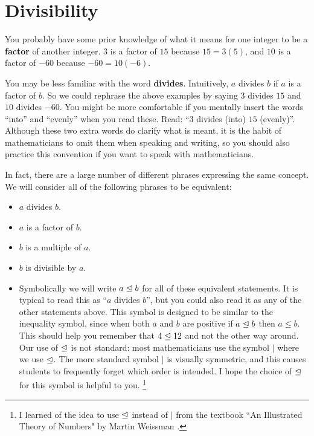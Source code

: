 \section{Divisibility}

You probably have some prior knowledge of what it means for one integer to be a \textbf{factor} of another integer.  $3$ is a factor of $15$ because $15 = 3(5)$, and $10$ is a factor of $-60$ because $-60 = 10(-6)$.  

You may be less familiar with the word \textbf{divides}.  Intuitively, $a$ divides $b$ if $a$ is a factor of $b$.  So we could rephrase the above examples by saying $3$ divides $15$ and $10$ divides $-60$.  You might be more comfortable if you mentally insert the words ``into'' and ``evenly'' when you read these.  Read:  ``$3$ divides (into) $15$ (evenly)''.  Although these two extra words do clarify what is meant, it is the habit of mathematicians to omit them when speaking and writing, so you should also practice this convention if you want to speak with mathematicians.

In fact, there are a large number of different phrases expressing the same concept.  We will consider all of the following phrases to be equivalent:

\begin{itemize}
	\item $a$ divides $b$.
	\item $a$ is a factor of $b$.
	\item $b$ is a multiple of $a$.
	\item $b$ is divisible by $a$.
	\item Symbolically we will write $a \trianglelefteq b$ for all of these equivalent statements.  It is typical to read this as ``$a$ divides $b$'', but you could also read it as any of the other statements above. This symbol is designed to be similar to the inequality symbol, since when both $a$ and $b$ are positive  if $a \trianglelefteq b$ then $a \leq b$.  This should help you remember that $4 \trianglelefteq 12$ and not the other way around.  Our use of $\trianglelefteq$ is not standard:  most mathematicians use the symbol $|$ where we use $\trianglelefteq$.  The more standard symbol $|$ is visually symmetric, and this causes students to frequently forget which order is intended.  I hope the choice of $\trianglelefteq$ for this symbol is helpful to you. \footnote{I learned of the idea to use $\trianglelefteq$ instead of $|$ from the textbook ``An Illustrated Theory of Numbers" by Martin Weissman \cite{wei17}.} 
\end{itemize}

